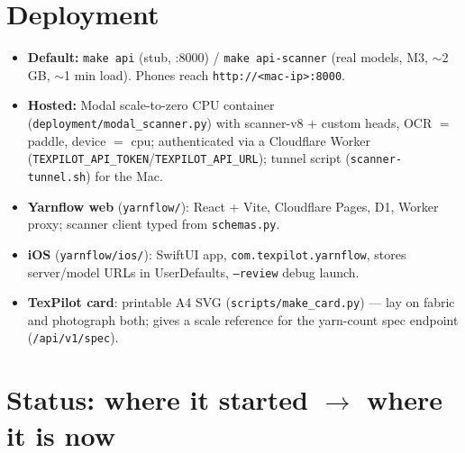 \documentclass[11pt,a4paper]{article}
\begin{document}
\section{Deployment}

\begin{itemize}[leftmargin=*]
  \item \textbf{Default:} \texttt{make api} (stub, :8000) / \texttt{make api-scanner} (real
        models, M3, $\sim$2 GB, $\sim$1 min load). Phones reach \texttt{http://<mac-ip>:8000}.
  \item \textbf{Hosted:} Modal scale-to-zero CPU container (\texttt{deployment/modal\_scanner.py})
        with scanner-v8 + custom heads, OCR $=$ paddle, device $=$ cpu; authenticated via a
        Cloudflare Worker (\texttt{TEXPILOT\_API\_TOKEN}/\texttt{TEXPILOT\_API\_URL}); tunnel
        script (\texttt{scanner-tunnel.sh}) for the Mac.
  \item \textbf{Yarnflow web} (\texttt{yarnflow/}): React + Vite, Cloudflare Pages, D1,
        Worker proxy; scanner client typed from \texttt{schemas.py}.
  \item \textbf{iOS} (\texttt{yarnflow/ios/}): SwiftUI app, \texttt{com.texpilot.yarnflow}, stores
        server/model URLs in UserDefaults, \texttt{--review} debug launch.
  \item \textbf{TexPilot card}: printable A4 SVG (\texttt{scripts/make\_card.py}) --- lay on
        fabric and photograph both; gives a scale reference for the yarn-count spec
        endpoint (\texttt{/api/v1/spec}).
\end{itemize}

\section{Status: where it started $\to$ where it is now}
\end{document}

